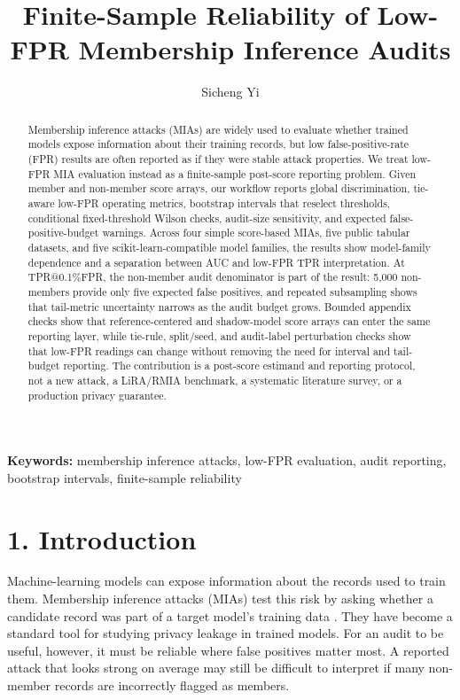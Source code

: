 \documentclass[
  10pt,
  twocolumn]{article}
\title{Finite-Sample Reliability of Low-FPR Membership Inference Audits}
\author{Sicheng Yi}
\date{}
\begin{document}
\maketitle

\begin{abstract}

Membership inference attacks (MIAs) are widely used to evaluate whether trained models expose information about their training records, but low false-positive-rate (FPR) results are often reported as if they were stable attack properties. We treat low-FPR MIA evaluation instead as a finite-sample post-score reporting problem. Given member and non-member score arrays, our workflow reports global discrimination, tie-aware low-FPR operating metrics, bootstrap intervals that reselect thresholds, conditional fixed-threshold Wilson checks, audit-size sensitivity, and expected false-positive-budget warnings. Across four simple score-based MIAs, five public tabular datasets, and five scikit-learn-compatible model families, the results show model-family dependence and a separation between AUC and low-FPR TPR interpretation. At TPR@0.1\%FPR, the non-member audit denominator is part of the result: 5,000 non-members provide only five expected false positives, and repeated subsampling shows that tail-metric uncertainty narrows as the audit budget grows. Bounded appendix checks show that reference-centered and shadow-model score arrays can enter the same reporting layer, while tie-rule, split/seed, and audit-label perturbation checks show that low-FPR readings can change without removing the need for interval and tail-budget reporting. The contribution is a post-score estimand and reporting protocol, not a new attack, a LiRA/RMIA benchmark, a systematic literature survey, or a production privacy guarantee.
\end{abstract}

\textbf{Keywords:} membership inference attacks, low-FPR evaluation, audit reporting, bootstrap intervals, finite-sample reliability

\hypertarget{introduction}{%
\section{1. Introduction}\label{introduction}}

Machine-learning models can expose information about the records used to train them. Membership inference attacks (MIAs) test this risk by asking whether a candidate record was part of a target model's training data \cite{ref-1,ref-2}. They have become a standard tool for studying privacy leakage in trained models. For an audit to be useful, however, it must be reliable where false positives matter most. A reported attack that looks strong on average may still be difficult to interpret if many non-member records are incorrectly flagged as members.
\end{document}
